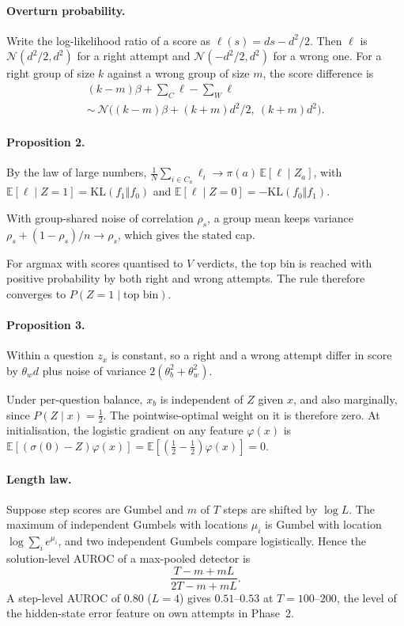 \paragraph{Overturn probability.}
Write the log-likelihood ratio of a score as $\ell(s)=ds-d^2/2$. Then $\ell$ is $\mathcal N(d^2/2,d^2)$ for a right
attempt and $\mathcal N(-d^2/2,d^2)$ for a wrong one. For a right group of size $k$ against a wrong group of size $m$,
the score difference is
\[
\begin{gathered}
(k-m)\beta+\textstyle\sum_{C}\ell-\sum_{W}\ell\\
\sim\ \mathcal N\big((k-m)\beta+(k+m)d^2/2,\ (k+m)d^2\big).
\end{gathered}
\]

\paragraph{Proposition 2.}
By the law of large numbers, $\frac1N\sum_{i\in C_a}\ell_i\to\pi(a)\,\mathbb E[\ell\mid Z_a]$, with
$\mathbb E[\ell\mid Z{=}1]=\mathrm{KL}(f_1\Vert f_0)$ and $\mathbb E[\ell\mid Z{=}0]=-\mathrm{KL}(f_0\Vert f_1)$.

With group-shared noise of correlation $\rho_s$, a group mean keeps variance $\rho_s+(1-\rho_s)/n\to\rho_s$, which gives
the stated cap.

For argmax with scores quantised to $V$ verdicts, the top bin is reached with positive probability by both right and
wrong attempts. The rule therefore converges to $P(Z{=}1\mid\text{top bin})$.

\paragraph{Proposition 3.}
Within a question $z_x$ is constant, so a right and a wrong attempt differ in score by $\theta_w d$ plus noise of
variance $2(\theta_b^2+\theta_w^2)$.

Under per-question balance, $x_b$ is independent of $Z$ given $x$, and also marginally, since $P(Z\mid x)=\frac12$.
The pointwise-optimal weight on it is therefore zero. At initialisation, the logistic gradient on any feature
$\varphi(x)$ is $\mathbb E[(\sigma(0)-Z)\varphi(x)]=\mathbb E[(\frac12-\frac12)\varphi(x)]=0$.

\paragraph{Length law.}
Suppose step scores are Gumbel and $m$ of $T$ steps are shifted by $\log L$. The maximum of independent Gumbels with
locations $\mu_i$ is Gumbel with location $\log\sum_ie^{\mu_i}$, and two independent Gumbels compare logistically.
Hence the solution-level AUROC of a max-pooled detector is
\[
\frac{T-m+mL}{2T-m+mL}.
\]
A step-level AUROC of $0.80$ ($L=4$) gives $0.51$--$0.53$ at $T=100$--$200$, the level of the hidden-state error
feature on own attempts in Phase~2.


